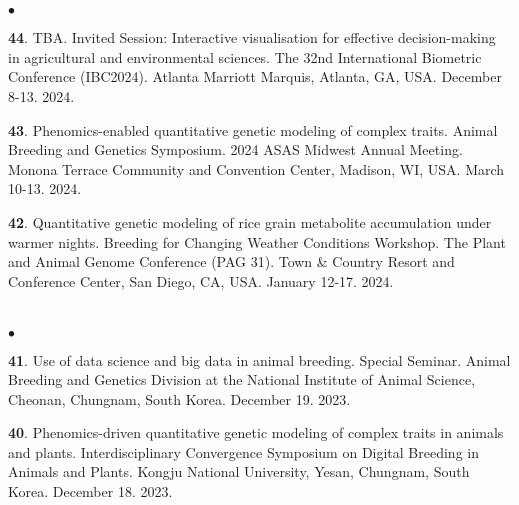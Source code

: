 \documentclass[margin,line,10pt]{res}
\newenvironment{list2}{
  \begin{list}{$\bullet$}{%
      \setlength{\itemsep}{0in}
      \setlength{\parsep}{0in} \setlength{\parskip}{0in}
      \setlength{\topsep}{0in} \setlength{\partopsep}{0in} 
      \setlength{\leftmargin}{0.2in}}}{\end{list}}
\begin{document}
\begin{resume}
\section{}
\begin{list2}

  \item [{\bf 44}.] TBA. Invited Session: Interactive visualisation for effective decision-making in agricultural and environmental sciences. The 32nd International Biometric Conference (IBC2024). Atlanta Marriott Marquis, Atlanta, GA, USA. December 8-13. 2024. 

  \vspace{0.5cm}

  \item [{\bf 43}.] Phenomics-enabled quantitative genetic modeling of complex traits. Animal Breeding and Genetics Symposium. 2024 ASAS Midwest Annual Meeting. Monona Terrace Community and Convention Center, Madison, WI, USA. March 10-13. 2024. 

  \vspace{0.5cm}

  \item [{\bf 42}.] Quantitative genetic modeling of rice grain metabolite accumulation under warmer nights. Breeding for Changing Weather Conditions Workshop. The Plant and Animal Genome Conference (PAG 31). Town \& Country Resort and Conference Center, San Diego, CA, USA. January 12-17. 2024. 

\end{list2}


\section{}
\begin{list2}

  \item [{\bf 41}.] Use of data science and big data in animal breeding. Special Seminar. Animal Breeding and Genetics Division at the National Institute of Animal Science, Cheonan, Chungnam, South Korea. December 19. 2023. 

  \vspace{0.5cm}

  \item [{\bf 40}.] Phenomics-driven quantitative genetic modeling of complex traits in animals and plants. Interdisciplinary Convergence Symposium on Digital Breeding in Animals and Plants. Kongju National University, Yesan, Chungnam, South Korea. December 18. 2023. 


\end{list2}
\end{resume}
\end{document}

